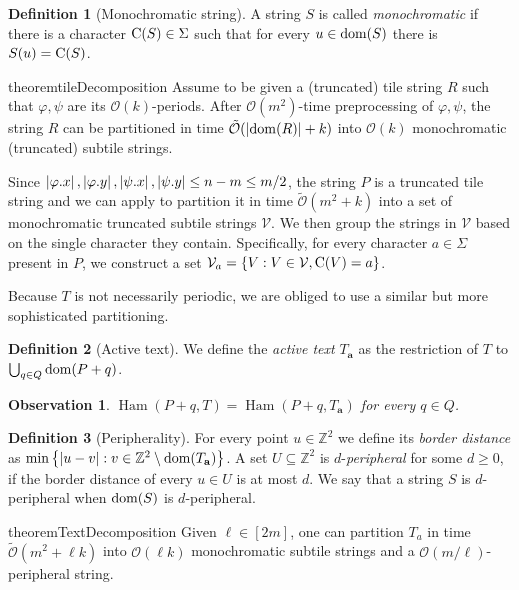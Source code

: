 \documentclass[11pt, letterpaper]{article}
\theoremstyle{plain}
\newtheorem{observation}{Observation}
\theoremstyle{definition}
\newtheorem{definition}{Definition}
\theoremstyle{remark}
\newcommand{\Z}{\mathbb{Z}}
\renewcommand{\O}{\mathcal{O}}
\newcommand{\tO}{\tilde{\mathcal{O}}}
\newcommand{\V}{\mathcal{V}}
\renewcommand{\phi}{\varphi}
\newcommand{\set}[1]{\left\lbrace #1 \right\rbrace}
\DeclareMathOperator*{\Ham}{Ham}
\newcommand{\absolute}[1]{\left\lvert#1\right\rvert}
\begin{document}
\begin{definition}[Monochromatic string]
A string $S$ is called \emph{monochromatic} if there is a character $\operatorname*{C}(S) \in \Sigma$ such that for every $u \in \operatorname*{dom}(S)$ there is $S(u) = \operatorname*{C}(S)$.  
\end{definition}

\begin{restatable*}{theorem}{tileDecomposition}\label{tile_decomposition}
Assume to be given a (truncated) tile string $R$ such that $\phi, \psi$ are its $\O(k)$-periods. After $\O(m^2)$-time preprocessing of $\phi, \psi$, the string $R$ can be partitioned in time $\tO(\absolute{\d{R}} + k)$ into $\O(k)$ monochromatic (truncated) subtile strings.
\end{restatable*}

Since $\absolute{\x{\phi}}, \absolute{\y{\phi}}, \absolute{\x{\psi}}, \absolute{\y{\psi}} \le n - m \le m / 2$, the string $P$ is a truncated tile string and we can apply  to partition it in time $\tO(m^2 + k)$ into a set of monochromatic truncated subtile strings $\V$. We then group the strings in $\V$ based on the single character they contain. Specifically, for every character $a \in \Sigma$ present in $P$, we construct a set $\V_a = \set{V : V \in \V, \getchar{V} = a}$.

Because $T$ is not necessarily periodic, we are obliged to use a similar but more sophisticated partitioning.

\newcommand{\Ta}{T_\mathbf{a}}
\begin{definition}[Active text]
We define the \emph{active text} $\Ta$ as the restriction of $T$ to $\bigcup_{q \in Q} \operatorname*{dom}(P + q)$. 
\end{definition}

\begin{observation}\label{obs:active_text}
$\Ham(P + q, T) = \Ham(P + q, \Ta)$ for every $q \in Q$.
\end{observation}

\begin{definition}[Peripherality]
For every point $u \in \Z^2$ we define its \emph{border distance} as $\min\set{\absolute{u - v} : v \in \Z^2 \setminus \d{\Ta}}$. A set $U \subseteq \Z^2$ is $d$-\emph{peripheral} for some $d \ge 0$, if the border distance of every $u \in U$ is at most $d$. We say that a string $S$ is $d$-peripheral when $\operatorname*{dom}(S)$ is $d$-peripheral.
\end{definition}

\begin{restatable*}{theorem}{TextDecomposition}\label{text_decomposition}
Given $\ell \in [2m]$, one can partition $T_a$ in time $\tO(m^2 + \ell k)$ into $\O(\ell k)$ monochromatic subtile strings and a $\O(m / \ell)$-peripheral string.
\end{restatable*}
\end{document}
